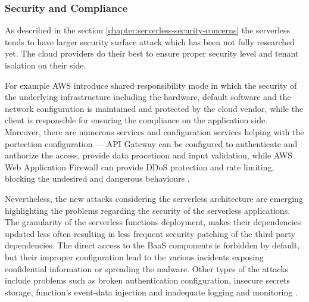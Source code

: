 

\subsubsection{Security and Compliance}

As described in the section \ref{chapter:serverless-security-concerns} the serverless tends to have larger security surface attack which has been not fully researched yet. 
The cloud providers do their best to ensure proper security level and tenant isolation on their side. 

For example AWS introduce shared responsibility mode in which the security of the underlying infrastructure including the hardware, default software and the network configuration is maintained and protected by the cloud vendor, while the client is responsible for ensuring the compliance on the application side.
Moreover, there are numerous services and configuration services helping with the portection configuration --- API Gateway can be configured to authenticate and authorize the access, provide data procetioon and input validation, while AWS Web Application Firewall can provide DDoS protection and rate limiting, blocking the undesired and dangerous behaviours \cite{EvaluationOfServerlessApplicationProgrammingModel}.

Nevertheless, the new attacks considering the serverless architecture are emerging highlighting the problems regarding the security of the serverless applications. The granularity of the serverless functions deployment, makes their dependencies updated less often resulting in less frequent security patching of the third party dependencies. 
The direct access to the BaaS components is forbidden by default, but their improper configuration lead to the various incidents exposing confidential information or spreading the malware.
Other types of the attacks include problems such as broken authentication configuration, insecure secrets storage, function's event-data injection and inadequate logging and monitoring \cite{EvaluationOfServerlessApplicationProgrammingModel}.

